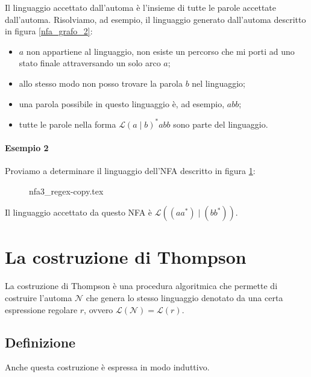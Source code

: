 \documentclass[class=book, crop=false, oneside, 12pt]{standalone}
\begin{document}
Il linguaggio accettato dall’automa è l’insieme di tutte le parole accettate dall’automa.
Risolviamo, ad esempio, il linguaggio generato dall’automa descritto in figura \ref{nfa_grafo_2}:
\begin{itemize}
    \item \(a\) non appartiene al linguaggio, non esiste un percorso che mi porti ad uno stato finale attraversando un solo arco \(a\);
    \item allo stesso modo non posso trovare la parola \(b\) nel linguaggio;
    \item una parola possibile in questo linguaggio è, ad esempio, \(abb\);
    \item tutte le parole nella forma \(\mathcal{L}(a \mid b)^\ast abb\) sono parte del linguaggio.
\end{itemize}

\paragraph{Esempio 2}
Proviamo a determinare il linguaggio dell'NFA descritto in figura \ref{nfa_grafo_3}:

\begin{figure}[htb]
    \centering
    {nfa3_regex-copy.tex}
    \caption{}
    \label{nfa_grafo_3}
\end{figure}

\noindent Il linguaggio accettato da questo NFA è \(\mathcal{L}((a a^* ) \mid ( b b^\ast ))\).

\section{La costruzione di Thompson}
La costruzione di Thompson è una procedura algoritmica che permette di costruire l’automa \(\mathcal{N}\) che genera lo stesso linguaggio denotato da una certa espressione regolare \(r\), ovvero \(\mathcal{L}(\mathcal{N}) = \mathcal{L}(r)\).

\subsection{Definizione}
Anche questa costruzione è espressa in modo induttivo.
\end{document}
